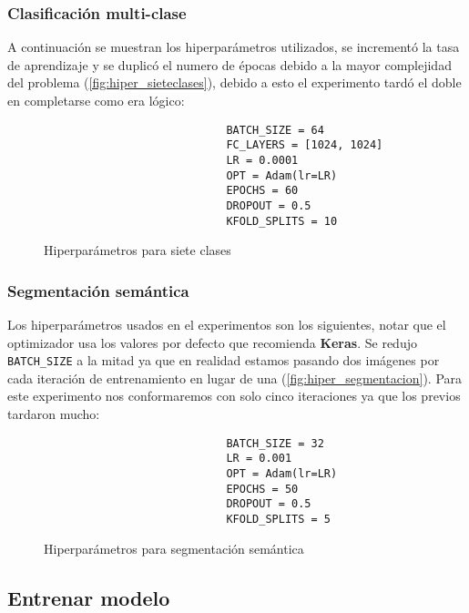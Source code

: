 \subsubsection{Clasificación multi-clase}

A continuación se muestran los hiperparámetros utilizados, se incrementó la tasa
de aprendizaje y se duplicó el numero de épocas debido a la mayor complejidad
del problema  (\autoref{fig:hiper_sieteclases}), debido a esto el experimento
tardó el doble en completarse como era lógico:

\begin{figure}[H]
    \centering
\begin{verbatim}
                            BATCH_SIZE = 64
                            FC_LAYERS = [1024, 1024]
                            LR = 0.0001
                            OPT = Adam(lr=LR)
                            EPOCHS = 60
                            DROPOUT = 0.5
                            KFOLD_SPLITS = 10
\end{verbatim}
\caption{Hiperparámetros para siete clases}
\label{fig:hiper_sieteclases}
\end{figure}

\subsubsection{Segmentación semántica}

Los hiperparámetros usados en el experimentos son los siguientes, notar que el
optimizador usa los valores por defecto que recomienda \textbf{Keras}. Se redujo
\texttt{BATCH_SIZE} a la mitad ya que en realidad estamos pasando dos
imágenes por cada iteración de entrenamiento en lugar de una
(\autoref{fig:hiper_segmentacion}). Para este experimento nos conformaremos con
solo cinco iteraciones ya que los previos tardaron mucho:

\begin{figure}[H]
    \centering
\begin{verbatim}
                            BATCH_SIZE = 32
                            LR = 0.001
                            OPT = Adam(lr=LR)
                            EPOCHS = 50
                            DROPOUT = 0.5
                            KFOLD_SPLITS = 5
\end{verbatim}
\caption{Hiperparámetros para segmentación semántica}
\label{fig:hiper_segmentacion}
\end{figure}

\subsection{Entrenar modelo}

